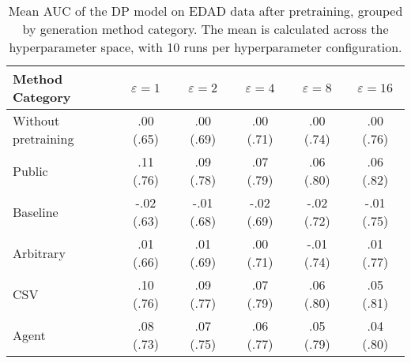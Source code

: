\begin{table}[h!]
    \centering
    \caption{Mean AUC of the DP model on EDAD data after pretraining, grouped by generation method category. The mean is calculated across the hyperparameter space, with 10 runs per hyperparameter configuration.}
    \label{tab:epsilon_comparison}
    \begin{tabular}{lccccc}
    \toprule
    Method Category & $\varepsilon=1$ & $\varepsilon=2$ & $\varepsilon=4$ & $\varepsilon=8$ & $\varepsilon=16$ \\
    \midrule
    Without pretraining & .00 {\small (.65)} & .00 {\small (.69)} & .00 {\small (.71)} & .00 {\small (.74)} & .00 {\small (.76)} \\
    \arrayrulecolor{black!50!}\midrule
    Public & \cellcolor{gold!30}.11 {\small (.76)} & \cellcolor{gold!30}.09 {\small (.78)} & \cellcolor{gold!30}.07 {\small (.79)} & \cellcolor{silver!30}.06 {\small (.80)} & \cellcolor{gold!30}.06 {\small (.82)} \\
    \arrayrulecolor{black!50!}\midrule
    Baseline & -.02 {\small (.63)} & -.01 {\small (.68)} & -.02 {\small (.69)} & -.02 {\small (.72)} & -.01 {\small (.75)} \\
    \arrayrulecolor{black!50!}\midrule
    Arbitrary & .01 {\small (.66)} & .01 {\small (.69)} & .00 {\small (.71)} & -.01 {\small (.74)} & .01 {\small (.77)} \\
    \arrayrulecolor{black!50!}\midrule
    CSV & \cellcolor{silver!30}.10 {\small (.76)} & \cellcolor{silver!30}.09 {\small (.77)} & \cellcolor{silver!30}.07 {\small (.79)} & \cellcolor{gold!30}.06 {\small (.80)} & \cellcolor{silver!30}.05 {\small (.81)} \\
    Agent & \cellcolor{bronze!30}.08 {\small (.73)} & \cellcolor{bronze!30}.07 {\small (.75)} & \cellcolor{bronze!30}.06 {\small (.77)} & \cellcolor{bronze!30}.05 {\small (.79)} & \cellcolor{bronze!30}.04 {\small (.80)} \\
    \bottomrule
    \end{tabular}
\end{table}